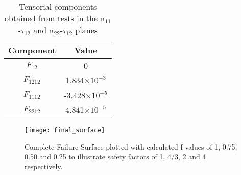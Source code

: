\documentclass[main.tex]{subfiles}
\begin{document}
\begin{table} [!htbp]
	\centering
	\caption{Tensorial components obtained from tests in the $\sigma_{11}$-$\tau_{12}$ and $\sigma_{22}$-$\tau_{12}$ planes}
	\begin{tabular}{ c c } 
		\toprule
		\textbf{Component} & \textbf{Value} \\
		\midrule
		$F_{12}$ & 0\\
		$F_{1212}$ & 1.834$\times 10^{-3}$\\
		$F_{1112}$ & -3.428$\times 10^{-5}$\\
		$F_{2212}$ & 4.841$\times 10^{-5}$\\
		\bottomrule
	\end{tabular}
	\label{tab:remcalc}
\end{table}  

\begin{figure}[!htbp]
	\center
	\texttt{[image: final\_surface]}
	\captionsetup{justification=centering} %
	\caption[Complete Failure Surface]{Complete Failure Surface plotted with calculated f values of 1, 0.75, 0.50 and 0.25 to illustrate safety factors of 1, 4/3, 2 and 4 respectively.} \label{fig:fullfs}
\end{figure} 


% 

\end{document}

